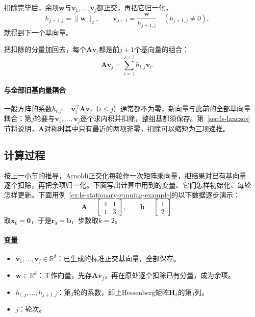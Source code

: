 扣除完毕后，余项$\bm w$与$\bm v_1,\ldots,\bm v_j$都正交，再把它归一化，
\begin{equation}
 h_{j+1,j}=\lVert\bm w\rVert_2,\qquad \bm v_{j+1}=\frac{\bm w}{h_{j+1,j}}\quad(h_{j+1,j}\ne0),
 \label{eq:ls-arnoldi-normalize}
\end{equation}
就得到下一个基向量。

把扣除的分量加回去，每个$\bm A\bm v_j$都是前$j+1$个基向量的组合：
\begin{equation}
 \bm A\bm v_j=\sum_{i=1}^{j+1}h_{i,j}\bm v_i .
 \label{eq:ls-arnoldi-column}
\end{equation}

\paragraph{与全部旧基向量耦合}
一般方阵的系数$h_{i,j}=\bm v_i^\top\bm A\bm v_j$（$i\le j$）通常都不为零，新向量与此前的全部基向量耦合：第$j$轮要与$\bm v_1,\ldots,\bm v_j$逐个求内积并扣除，整组基都须保存。第~\ref{sec:ls-lanczos}节将说明，$\bm A$对称时其中只有最近的两项非零，扣除可以缩短为三项递推。

\subsection{计算过程}

按上一小节的推导，Arnoldi正交化每轮作一次矩阵乘向量，把结果对已有基向量逐个扣除，再把余项归一化。下面写出计算中用到的变量、它们怎样初始化、每轮怎样更新。下面用例~\ref{ex:ls-stationary-running-example}的以下数据逐步演示：
\[
 \bm A=\begin{bmatrix}4&1\\1&3\end{bmatrix},\qquad \bm b=\begin{bmatrix}1\\2\end{bmatrix}.
\]
取$\bm x_0=\bm 0$，于是$\bm r_0=\bm b$，步数取$k=2$。

\paragraph{变量}
\begin{itemize}
 \item $\bm v_1,\ldots,\bm v_j\in\mathbb R^d$：已生成的标准正交基向量，全部保存。
 \item $\bm w\in\mathbb R^d$：工作向量，先存$\bm A\bm v_j$，再在原处逐个扣除已有分量，成为余项。
 \item $h_{1,j},\ldots,h_{j+1,j}$：第$j$轮的系数，即上Hessenberg矩阵$\overline{\bm H}_k$的第$j$列。
 \item $j$：轮次。
\end{itemize}

